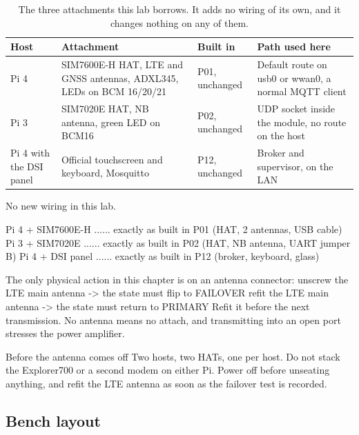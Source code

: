 
\begin{table}[H]\centering\small
\begin{tabular}{p{32mm}p{34mm}p{30mm}p{52mm}}
\toprule
Host & Attachment & Built in & Path used here \\
\midrule
Pi 4 & SIM7600E-H HAT, LTE and GNSS antennas, ADXL345, LEDs on BCM 16/20/21 & P01, unchanged & Default route on usb0 or wwan0, a normal MQTT client \\
Pi 3 & SIM7020E HAT, NB antenna, green LED on BCM16 & P02, unchanged & UDP socket inside the module, no route on the host \\
Pi 4 with the DSI panel & Official touchscreen and keyboard, Mosquitto & P12, unchanged & Broker and supervisor, on the LAN \\
\bottomrule
\end{tabular}
\caption{The three attachments this lab borrows. It adds no wiring of its own, and it changes nothing on any of them.}
\end{table}

\begin{asciiart}
No new wiring in this lab.

  Pi 4  + SIM7600E-H   ......  exactly as built in P01 (HAT, 2 antennas, USB cable)
  Pi 3  + SIM7020E     ......  exactly as built in P02 (HAT, NB antenna, UART jumper B)
  Pi 4  + DSI panel    ......  exactly as built in P12 (broker, keyboard, glass)

  The only physical action in this chapter is on an antenna connector:
    unscrew the LTE main antenna  -> the state must flip to FAILOVER
    refit the LTE main antenna    -> the state must return to PRIMARY
  Refit it before the next transmission. No antenna means no attach, and
  transmitting into an open port stresses the power amplifier.
\end{asciiart}

\begin{rulebox}{Before the antenna comes off}
Two hosts, two HATs, one per host. Do not stack the Explorer700 or a second modem on either Pi. Power off before unseating anything, and refit the LTE antenna as soon as the failover test is recorded.
\end{rulebox}

\subsection*{Bench layout}

